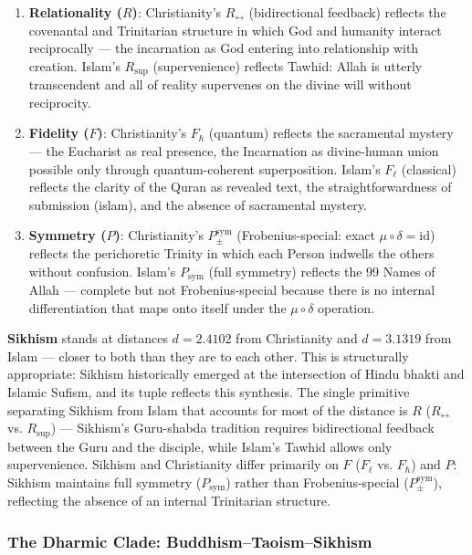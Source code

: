 \documentclass[12pt,a4paper]{article}
\begin{document}
\begin{enumerate}
    \item \textbf{Relationality ($R$)}: Christianity's $R_{\leftrightarrow}$ (bidirectional feedback) reflects the covenantal and Trinitarian structure in which God and humanity interact reciprocally --- the incarnation as God entering into relationship with creation. Islam's $R_\text{sup}$ (supervenience) reflects Tawhid: Allah is utterly transcendent and all of reality supervenes on the divine will without reciprocity.
    \item \textbf{Fidelity ($F$)}: Christianity's $F_{\hbar}$ (quantum) reflects the sacramental mystery --- the Eucharist as real presence, the Incarnation as divine-human union possible only through quantum-coherent superposition. Islam's $F_{\ell}$ (classical) reflects the clarity of the Quran as revealed text, the straightforwardness of submission (islam), and the absence of sacramental mystery.
    \item \textbf{Symmetry ($P$)}: Christianity's $P_{\pm}^{\text{sym}}$ (Frobenius-special: exact $\mu\circ\delta = \text{id}$) reflects the perichoretic Trinity in which each Person indwells the others without confusion. Islam's $P_\text{sym}$ (full symmetry) reflects the 99 Names of Allah --- complete but not Frobenius-special because there is no internal differentiation that maps onto itself under the $\mu\circ\delta$ operation.
\end{enumerate}

\textbf{Sikhism} stands at distances $d = 2.4102$ from Christianity and $d = 3.1319$ from Islam --- closer to both than they are to each other. This is structurally appropriate: Sikhism historically emerged at the intersection of Hindu bhakti and Islamic Sufism, and its tuple reflects this synthesis. The single primitive separating Sikhism from Islam that accounts for most of the distance is $R$ ($R_{\leftrightarrow}$ vs. $R_\text{sup}$) --- Sikhism's Guru-shabda tradition requires bidirectional feedback between the Guru and the disciple, while Islam's Tawhid allows only supervenience. Sikhism and Christianity differ primarily on $F$ ($F_{\ell}$ vs. $F_{\hbar}$) and $P$: Sikhism maintains full symmetry ($P_\text{sym}$) rather than Frobenius-special ($P_{\pm}^{\text{sym}}$), reflecting the absence of an internal Trinitarian structure.

\subsubsection{The Dharmic Clade: Buddhism--Taoism--Sikhism}
\end{document}
